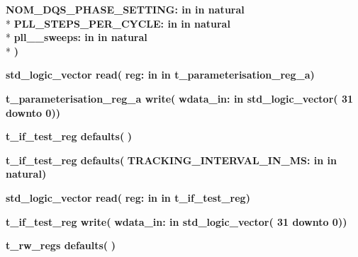 \begin{DoxyCompactItemize}
{\bfseries \textcolor{vhdlchar}{N\+O\+M\+\_\+\+D\+Q\+S\+\_\+\+P\+H\+A\+S\+E\+\_\+\+S\+E\+T\+T\+I\+N\+G\+: }\textcolor{stringliteral}{in }\textcolor{vhdlchar}{in natural}}\\*
{\bfseries \textcolor{vhdlchar}{P\+L\+L\+\_\+\+S\+T\+E\+P\+S\+\_\+\+P\+E\+R\+\_\+\+C\+Y\+C\+L\+E\+: }\textcolor{stringliteral}{in }\textcolor{vhdlchar}{in natural}}\\*
{\bfseries \textcolor{vhdlchar}{pll\+\_\+\_\+sweeps\+: }\textcolor{stringliteral}{in }\textcolor{vhdlchar}{in natural}}\\*
{\bfseries  )} 
\item 
{\bfseries {\bfseries \textcolor{comment}{std\+\_\+logic\+\_\+vector}\textcolor{vhdlchar}{ }}} {\bf read}{\bfseries  ( }{\bfseries \textcolor{vhdlchar}{reg\+: }\textcolor{stringliteral}{in }\textcolor{vhdlchar}{in t\+\_\+parameterisation\+\_\+reg\+\_\+a}}{\bfseries  )} 
\item 
{\bfseries {\bfseries \textcolor{vhdlchar}{t\+\_\+parameterisation\+\_\+reg\+\_\+a}\textcolor{vhdlchar}{ }}} {\bf write}{\bfseries  ( }{\bfseries \textcolor{vhdlchar}{wdata\+\_\+in\+: }\textcolor{stringliteral}{in }\textcolor{vhdlchar}{std\+\_\+logic\+\_\+vector( 31 downto  0)}}{\bfseries  )} 
\item 
{\bfseries {\bfseries \textcolor{vhdlchar}{t\+\_\+if\+\_\+test\+\_\+reg}\textcolor{vhdlchar}{ }}} {\bf defaults}{\bfseries  ( }{\bfseries  )} 
\item 
{\bfseries {\bfseries \textcolor{vhdlchar}{t\+\_\+if\+\_\+test\+\_\+reg}\textcolor{vhdlchar}{ }}} {\bf defaults}{\bfseries  ( }{\bfseries \textcolor{vhdlchar}{T\+R\+A\+C\+K\+I\+N\+G\+\_\+\+I\+N\+T\+E\+R\+V\+A\+L\+\_\+\+I\+N\+\_\+\+M\+S\+: }\textcolor{stringliteral}{in }\textcolor{vhdlchar}{in natural}}{\bfseries  )} 
\item 
{\bfseries {\bfseries \textcolor{comment}{std\+\_\+logic\+\_\+vector}\textcolor{vhdlchar}{ }}} {\bf read}{\bfseries  ( }{\bfseries \textcolor{vhdlchar}{reg\+: }\textcolor{stringliteral}{in }\textcolor{vhdlchar}{in t\+\_\+if\+\_\+test\+\_\+reg}}{\bfseries  )} 
\item 
{\bfseries {\bfseries \textcolor{vhdlchar}{t\+\_\+if\+\_\+test\+\_\+reg}\textcolor{vhdlchar}{ }}} {\bf write}{\bfseries  ( }{\bfseries \textcolor{vhdlchar}{wdata\+\_\+in\+: }\textcolor{stringliteral}{in }\textcolor{vhdlchar}{std\+\_\+logic\+\_\+vector( 31 downto  0)}}{\bfseries  )} 
\item 
{\bfseries {\bfseries \textcolor{vhdlchar}{t\+\_\+rw\+\_\+regs}\textcolor{vhdlchar}{ }}} {\bf defaults}{\bfseries  ( }{\bfseries  )} 

\end{DoxyCompactItemize}
